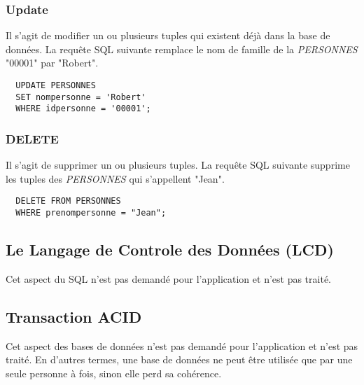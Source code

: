 \subsubsection{Update}
Il s'agit de modifier un ou plusieurs tuples qui existent déjà dans la base de données.
La requête SQL suivante remplace le nom de famille de la \textit{PERSONNES} "00001" par "Robert".
\begin{lstlisting}
  UPDATE PERSONNES
  SET nompersonne = 'Robert'
  WHERE idpersonne = '00001';
\end{lstlisting}

\subsubsection{DELETE}
Il s'agit de supprimer un ou plusieurs tuples.
La requête SQL suivante supprime les tuples des \textit{PERSONNES} qui s'appellent "Jean".
\begin{lstlisting}
  DELETE FROM PERSONNES
  WHERE prenompersonne = "Jean";
\end{lstlisting}

\subsection{Le Langage de Controle des Données (LCD)}
Cet aspect du SQL n'est pas demandé pour l'application et n'est pas traité.

\subsection{Transaction ACID}
Cet aspect des bases de données n'est pas demandé pour l'application et n'est pas traité.
En d'autres termes, une base de données ne peut être utilisée que par une seule personne à fois, sinon elle perd sa cohérence.
